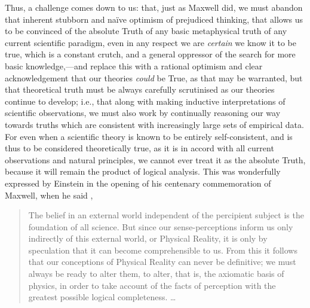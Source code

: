 Thus, a challenge comes down to us: that, just as Maxwell did, we must abandon that inherent stubborn and na\"{i}ve optimism of prejudiced thinking, that allows us to be convinced of the absolute Truth of any basic metaphysical truth of any current scientific paradigm, even in any respect we are \textit{certain} we know it to be true, which is a constant crutch, and a general oppressor of the search for more basic knowledge,---and replace this with a rational optimism and clear acknowledgement that our theories \textit{could} be True, as that may be warranted, but that theoretical truth must be always carefully scrutinised as our theories continue to develop; i.e., that along with making inductive interpretations of scientific observations, we must also work by continually reasoning our way towards truths which are consistent with increasingly large sets of empirical data. For even when a scientific theory is known to be entirely self-consistent, and is thus to be considered theoretically true, as it is in accord with all current observations and natural principles, we cannot ever treat it as the absolute Truth, because it will remain the product of logical analysis. This was wonderfully expressed by Einstein in the opening of his centenary commemoration of Maxwell, when he said \cite{Thomson1931},
\begin{quotation}
The belief in an external world independent of the percipient subject is the foundation of all science. But since our sense-perceptions inform us only indirectly of this external world, or Physical Reality, it is only by speculation that it can become comprehensible to us. From this it follows that our conceptions of Physical Reality can never be definitive; we must always be ready to alter them, to alter, that is, the axiomatic basis of physics, in order to take account of the facts of perception with the greatest possible logical completeness. \ldots
\end{quotation}


